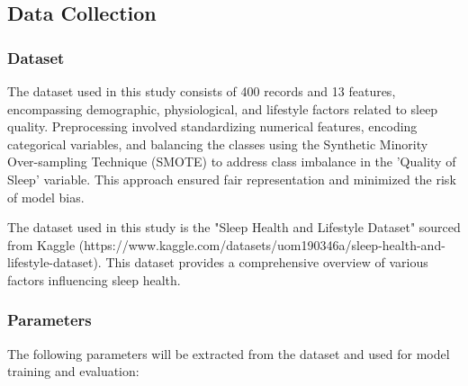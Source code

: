 \documentclass[conference]{IEEEtran}
\begin{document}
\subsection{Data Collection}
\subsubsection{Dataset} 
The dataset used in this study consists of 400 records and 13 features, encompassing demographic, physiological, and lifestyle factors related to sleep quality. Preprocessing involved standardizing numerical features, encoding categorical variables, and balancing the classes using the Synthetic Minority Over-sampling Technique (SMOTE) to address class imbalance in the 'Quality of Sleep' variable. This approach ensured fair representation and minimized the risk of model bias.

The dataset used in this study is the "Sleep Health and Lifestyle Dataset" sourced from Kaggle (https://www.kaggle.com/datasets/uom190346a/sleep-health-and-lifestyle-dataset). This dataset provides a comprehensive overview of various factors influencing sleep health.

\subsubsection{\textbf{Parameters}} The following parameters will be extracted from the dataset and used for model training and evaluation:
\end{document}
